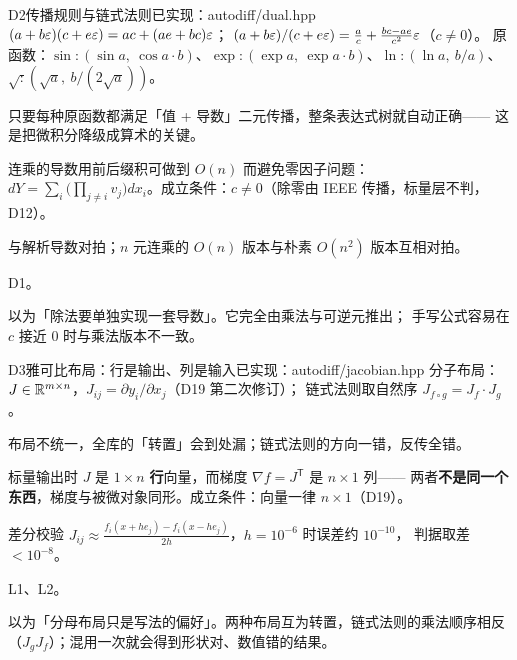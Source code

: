 \begin{know}{D2}{传播规则与链式法则}{已实现：autodiff/dual.hpp}
 $(a+b\varepsilon)(c+e\varepsilon)=ac+(ae+bc)\varepsilon$；
$(a+b\varepsilon)/(c+e\varepsilon)=\frac ac+\frac{bc-ae}{c^{2}}\varepsilon$（$c\ne0$）。
原函数：$\sin:( \sin a,\ \cos a\cdot b)$、$\exp:(\exp a,\ \exp a\cdot b)$、$\ln:(\ln a,\ b/a)$、
$\sqrt:(\sqrt a,\ b/(2\sqrt a))$。

 只要每种原函数都满足「值 + 导数」二元传播，整条表达式树就自动正确——
这是把微积分降级成算术的关键。

 连乘的导数用前后缀积可做到 $O(n)$ 而避免零因子问题：
$dY=\sum_i\big(\prod_{j\ne i}v_j\big)dx_i$。成立条件：$c\ne0$（除零由 IEEE 传播，标量层不判，D12）。

 与解析导数对拍；$n$ 元连乘的 $O(n)$ 版本与朴素 $O(n^{2})$ 版本互相对拍。

 D1。

 以为「除法要单独实现一套导数」。它完全由乘法与可逆元推出；
手写公式容易在 $c$ 接近 0 时与乘法版本不一致。
\end{know}

\begin{know}{D3}{雅可比布局：行是输出、列是输入}{已实现：autodiff/jacobian.hpp}
 分子布局：$J\in\mathbb{R}^{m\times n}$，$J_{ij}=\partial y_i/\partial x_j$（D19 第二次修订）；
链式法则取自然序 $J_{f\circ g}=J_f\cdot J_g$。

 布局不统一，全库的「转置」会到处漏；链式法则的方向一错，反传全错。

 标量输出时 $J$ 是 $1\times n$ \textbf{行}向量，而梯度 $\nabla f=J^{\mathsf T}$ 是 $n\times 1$ 列——
两者\textbf{不是同一个东西}，梯度与被微对象同形。成立条件：向量一律 $n\times1$（D19）。

 差分校验 $J_{ij}\approx\frac{f_i(x+he_j)-f_i(x-he_j)}{2h}$，$h=10^{-6}$ 时误差约 $10^{-10}$，
判据取差 $<10^{-8}$。

 L1、L2。

 以为「分母布局只是写法的偏好」。两种布局互为转置，链式法则的乘法顺序相反
（$J_gJ_f$）；混用一次就会得到形状对、数值错的结果。
\end{know}

